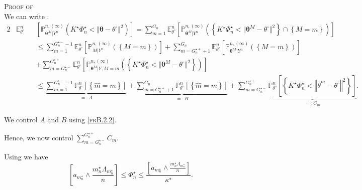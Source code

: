 \begin{pro}{\textsc{Proof of } \\}
We can write :
\begin{alignat*}{2}
& \mathds{E}_{\theta^{\circ}}^{n} && \left[\mathds{P}_{\boldsymbol{\theta}^{M}\vert Y^{n}}^{n, (\infty)}\left(K^{\star} \Phi_{n}^{\star} < \Vert \boldsymbol{\theta} - \theta^{\circ} \Vert ^{2}\right)\right] = \sum\limits_{m = 1}^{G_{n}} \mathds{E}_{\theta^{\circ}}^{n}\left[\mathds{P}_{\boldsymbol{\theta}^{M} \vert Y^{n}}^{n, (\infty)}\left(\left\{K^{\star} \Phi_{n}^{\star} < \Vert \boldsymbol{\theta}^{M} - \theta^{\circ} \Vert^{2}\right\} \cap \left\{M = m\right\}\right)\right]\\
& && \leq \sum\limits_{m = 1}^{G_{n}^{\star-} - 1} \mathds{E}_{\theta^{\circ}}^{n}\left[\mathds{P}_{M \vert Y^{n}}^{n, (\infty)}\left(\left\{M = m\right\}\right)\right] + \sum\limits_{m = G_{n}^{\star+} + 1}^{G_{n}} \mathds{E}_{\theta^{\circ}}^{n}\left[\mathds{P}_{\boldsymbol{\theta}^{M} \vert Y^{n}}^{n, (\infty)}\left(\left\{M = m\right\}\right)\right]\\
& && + \sum\limits_{m = G_{n}^{\star-}}^{G_{n}^{\star+}} \mathds{E}_{\theta^{\circ}}^{n}\left[\mathds{P}_{\boldsymbol{\theta}^{M}\vert Y, M = m}^{n, (\infty)}\left(\left\{K^{\star} \Phi_{n}^{\star} < \Vert \boldsymbol{\theta}^{M} - \theta^{\circ} \Vert^{2}\right\}\right)\right]\\
& && \leq \underbrace{\sum\limits_{m = 1}^{G_{n}^{\star-} - 1} \mathds{P}_{\theta^{\circ}}^{n}\left[\left\{\widehat{m} = m\right\}\right]}_{=: A} + \underbrace{\sum\limits_{m = G_{n}^{\star+} + 1}^{G_{n}} \mathds{P}_{\theta^{\circ}}^{n}\left[\left\{\widehat{m} = m\right\}\right]}_{=: B} + \sum\limits_{m = G_{n}^{\star-}}^{G_{n}^{\star+}} \underbrace{\mathds{P}_{\theta^{\circ}}^{n}\left[\left\{K^{\star} \Phi_{n}^{\star} < \left\Vert \overline{\theta}^{m} - \theta^{\circ} \right\Vert^{2}\right\}\right]}_{=: C_{m}}.
\end{alignat*}

\medskip

We control $A$ and $B$ using \textsc{\cref{prB.2.2}}.

Hence, we now control $\sum\limits_{m = G_{n}^{\star-}}^{G_{n}^{\star+}} C_{m}.$

\medskip

Using  we have
\[\left[a_{m_{n}^{\star}} \wedge \frac{m_{n}^{\star} \Lambda_{m_{n}^{\star}}}{n}\right] \leq \Phi_{n}^{\star} \leq  \frac{\left[a_{m_{n}^{\star}} \wedge \frac{m_{n}^{\star} \Lambda_{m_{n}^{\star}}}{n}\right]}{\kappa^{\star}}.\]


\end{pro}
